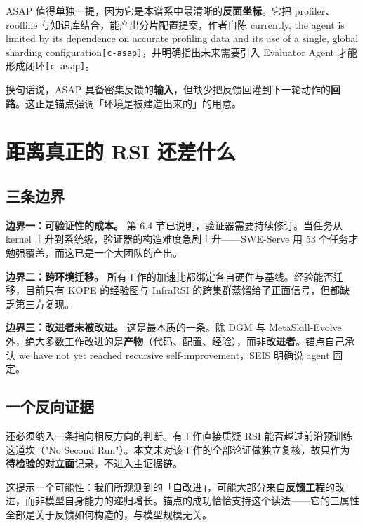 ASAP 值得单独一提，因为它是本谱系中最清晰的\textbf{反面坐标}。它把 profiler、roofline 与知识库结合，能产出分片配置提案，作者自陈 currently, the agent is limited by its dependence on accurate profiling data and its use of a single, global sharding configuration{\scriptsize\texttt{[c-\hspace{0pt}asap]}}，并明确指出未来需要引入 Evaluator Agent 才能形成闭环{\scriptsize\texttt{[c-\hspace{0pt}asap]}}。


换句话说，ASAP 具备密集反馈的\textbf{输入}，但缺少把反馈回灌到下一轮动作的\textbf{回路}。这正是锚点强调「环境是被建造出来的」的用意。



\section{距离真正的 RSI 还差什么}

\subsection{三条边界}

\textbf{边界一：可验证性的成本。} 第 6.4 节已说明，验证器需要持续修订。当任务从 kernel 上升到系统级，验证器的构造难度急剧上升——SWE-Serve 用 53 个任务才勉强覆盖，而这已是一个大团队的产出。


\textbf{边界二：跨环境迁移。} 所有工作的加速比都绑定各自硬件与基线。经验能否迁移，目前只有 KOPE 的经验图与 InfraRSI 的跨集群蒸馏给了正面信号，但都缺乏第三方复现。


\textbf{边界三：改进者未被改进。} 这是最本质的一条。除 DGM 与 MetaSkill-Evolve 外，绝大多数工作改进的是\textbf{产物}（代码、配置、经验），而非\textbf{改进者}。锚点自己承认 we have not yet reached recursive self-improvement，SEIS 明确说 agent 固定。


\subsection{一个反向证据}

还必须纳入一条指向相反方向的判断。有工作直接质疑 RSI 能否越过前沿预训练这道坎（"No Second Run"）。本文未对该工作的全部论证做独立复核，故只作为\textbf{待检验的对立面}记录，不进入主证据链。


这提示一个可能性：我们所观测到的「自改进」，可能大部分来自\textbf{反馈工程}的改进，而非模型自身能力的递归增长。锚点的成功恰恰支持这个读法——它的三属性全部是关于反馈如何构造的，与模型规模无关。


